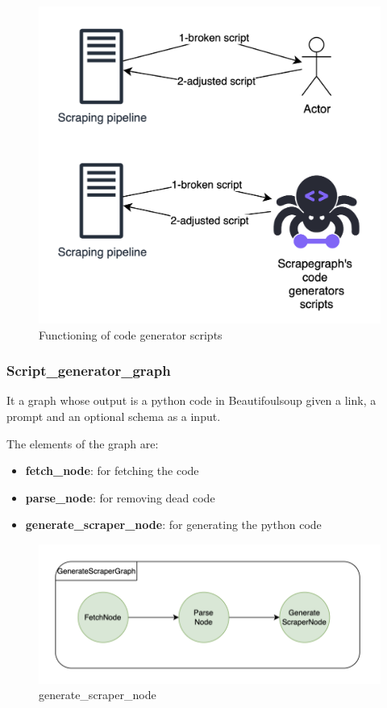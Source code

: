 \begin{figure}[h!]
    \centering
    \includegraphics[width=1\linewidth]{Assets/code_generator_scripts.png}
    \caption{Functioning of code generator scripts}
    \label{fig:actually indians}
\end{figure}
\subsubsection{Script\_generator\_graph}
It a graph whose output is a python code in Beautifoulsoup given a link, a prompt and an optional schema as a input.

The elements of the graph are:

\begin{itemize}
    \item \textbf{fetch\_node}: for fetching the code
    \item \textbf{parse\_node}: for removing dead code
    \item \textbf{generate\_scraper\_node}: for generating the python code
\end{itemize}

\begin{figure}[h!]
    \centering
    \includegraphics[width=0.85\linewidth]{Assets/generate_script_graph.png}
    \caption{generate\_scraper\_node}
    \label{fig:enter-label}
\end{figure}
